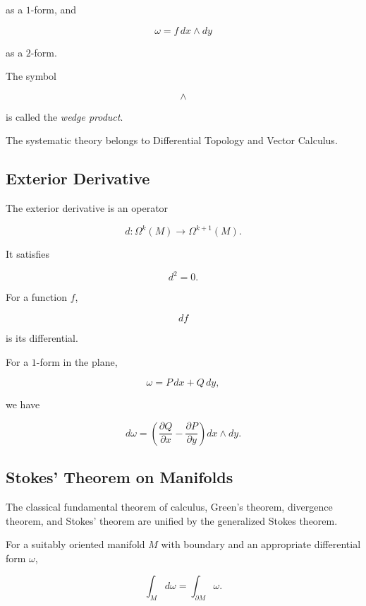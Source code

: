 as a \(1\)-form, and

\[
\omega=f\,dx\wedge dy
\]

as a \(2\)-form.

The symbol

\[
\wedge
\]

is called the \emph{wedge product}.

The systematic theory belongs to Differential Topology and Vector Calculus.

\subsection{Exterior Derivative}
\label{subsec:exterior-derivative}

The exterior derivative is an operator

\[
\boxed{
d:\Omega^k(M)\to\Omega^{k+1}(M).
}
\]

It satisfies

\[
\boxed{d^2=0.}
\]

For a function \(f\),

\[
df
\]

is its differential.

For a \(1\)-form in the plane,

\[
\omega=P\,dx+Q\,dy,
\]

we have

\[
\boxed{
d\omega
=
\left(
\frac{\partial Q}{\partial x}
-
\frac{\partial P}{\partial y}
\right)
dx\wedge dy.
}
\]

\subsection{Stokes' Theorem on Manifolds}
\label{subsec:stokes-manifolds}

The classical fundamental theorem of calculus, Green's theorem, divergence
theorem, and Stokes' theorem are unified by the generalized Stokes theorem.

\begin{theorem}
For a suitably oriented manifold \(M\) with boundary and an appropriate
differential form \(\omega\),

\[
\boxed{
\int_M d\omega
=
\int_{\partial M}\omega.
}
\]
\end{theorem}

